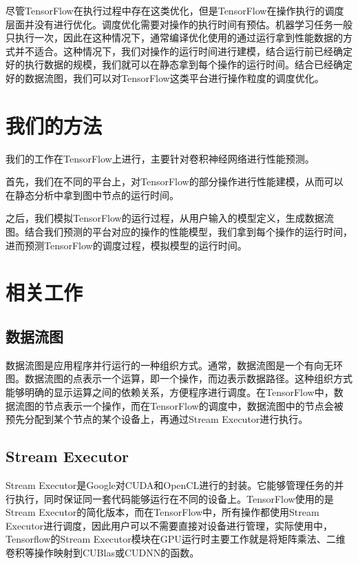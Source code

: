     尽管TensorFlow在执行过程中存在这类优化，但是TensorFlow在操作执行的调度层面并没有进行优化。调度优化需要对操作的执行时间有预估。机器学习任务一般只执行一次，因此在这种情况下，通常编译优化使用的通过运行拿到性能数据的方式并不适合。这种情况下，我们对操作的运行时间进行建模，结合运行前已经确定好的执行数据的规模，我们就可以在静态拿到每个操作的运行时间。结合已经确定好的数据流图，我们可以对TensorFlow这类平台进行操作粒度的调度优化。

\section{我们的方法}
    我们的工作在TensorFlow上进行，主要针对卷积神经网络进行性能预测。
    
    首先，我们在不同的平台上，对TensorFlow的部分操作进行性能建模，从而可以在静态分析中拿到图中节点的运行时间。

    之后，我们模拟TensorFlow的运行过程，从用户输入的模型定义，生成数据流图。结合我们预测的平台对应的操作的性能模型，我们拿到每个操作的运行时间，进而预测TensorFlow的调度过程，模拟模型的运行时间。

\section{相关工作}
\subsection{数据流图}
    数据流图是应用程序并行运行的一种组织方式。通常，数据流图是一个有向无环图。数据流图的点表示一个运算，即一个操作，而边表示数据路径。这种组织方式能够明确的显示运算之间的依赖关系，方便程序进行调度。在TensorFlow中，数据流图的节点表示一个操作，而在TensorFlow的调度中，数据流图中的节点会被预先分配到某个节点的某个设备上，再通过Stream Executor进行执行。

\subsection{Stream Executor}
    Stream Executor是Google对CUDA和OpenCL进行的封装。它能够管理任务的并行执行，同时保证同一套代码能够运行在不同的设备上。TensorFlow使用的是Stream Executor的简化版本，而在TensorFlow中，所有操作都使用Stream Executor进行调度，因此用户可以不需要直接对设备进行管理，实际使用中，Tensorflow的Stream Executor模块在GPU运行时主要工作就是将矩阵乘法、二维卷积等操作映射到CUBlas或CUDNN\cite{cudnn}的函数。
    